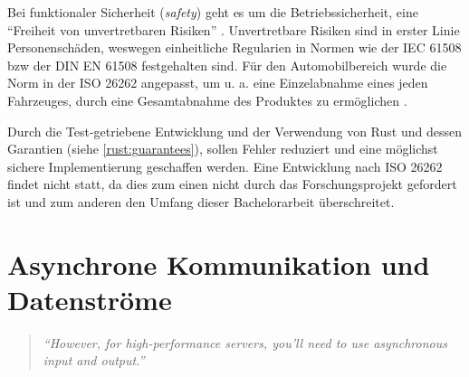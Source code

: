 Bei funktionaler Sicherheit (\textit{safety}) geht es um die Betriebssicherheit, eine \enquote{Freiheit von unvertretbaren Risiken} \cite[6]{safety}.
Unvertretbare Risiken sind in erster Linie Personenschäden, weswegen einheitliche Regularien in Normen wie der IEC 61508 bzw der DIN EN 61508 festgehalten sind.
Für den Automobilbereich wurde die Norm in der ISO 26262 angepasst, um u. a. eine Einzelabnahme eines jeden Fahrzeuges, durch eine Gesamtabnahme des Produktes zu ermöglichen \cite[14]{safety}.

Durch die Test-getriebene Entwicklung und der Verwendung von Rust und dessen Garantien (siehe \autoref{rust:guarantees}), sollen Fehler reduziert und eine möglichst sichere Implementierung geschaffen werden.
Eine Entwicklung nach ISO 26262 findet nicht statt, da dies zum einen nicht durch das Forschungsprojekt gefordert ist und zum anderen den Umfang dieser Bachelorarbeit überschreitet.


	
	
	


\section{Asynchrone Kommunikation und Datenströme}

\begin{quotation}
	\textit{\enquote{However, for high-performance servers, you'll need to use asynchronous input and output.}}
	\cite[454]{rust:orly_programming}
\end{quotation}

